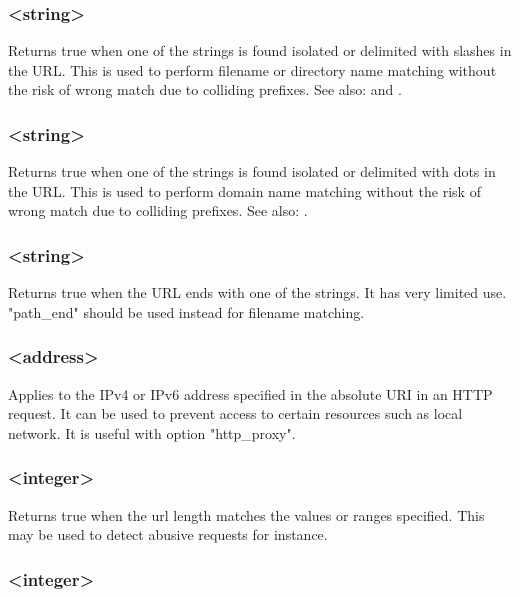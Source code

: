 \subsubsection[url\_dir]{ <string>}

  Returns true when one of the strings is found isolated or delimited with
  slashes in the URL. This is used to perform filename or directory name
  matching without the risk of wrong match due to colliding prefixes. See also:    and .

\subsubsection[url\_dom]{ <string>}

  Returns true when one of the strings is found isolated or delimited with dots
  in the URL. This is used to perform domain name matching without the risk of
  wrong match due to colliding prefixes. See also: .

\subsubsection[url\_end]{ <string>}

  Returns true when the URL ends with one of the strings. It has very limited
  use. "path\_end" should be used instead for filename matching.

\subsubsection[url\_ip]{ <address>}

  Applies to the IPv4 or IPv6 address specified in the absolute URI in an HTTP
  request. It can be used to prevent access to certain resources such as local
  network. It is useful with option "http\_proxy".

\subsubsection[url\_len]{ <integer>}

  Returns true when the url length matches the values or ranges specified. This
  may be used to detect abusive requests for instance.

\subsubsection[url\_port]{ <integer>}

